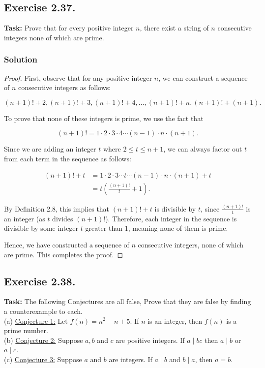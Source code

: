 \documentclass{article}
\begin{document}
\subsection{Exercise 2.37.}
\textbf{Task:} Prove that for every positive integer $n$, there exist a string of $n$ consecutive integers none of which are prime.

\subsubsection*{Solution}

\begin{proof}
    First, observe that for any positive integer $n$, we can construct a sequence of $n$ consecutive integers as follows:

    \[
    (n+1)! + 2, (n+1)! + 3, (n+1)! + 4, \dots, (n+1)! + n, (n+1)! + (n+1).
    \]

    To prove that none of these integers is prime, we use the fact that 

    \[
    (n+1)! = 1 \cdot 2 \cdot 3 \cdot 4 \cdots (n-1) \cdot n \cdot (n+1).
    \]

    Since we are adding an integer $t$ where $2 \leq t \leq n+1$, we can always factor out $t$ from each term in the sequence as follows:

    \begin{align*}
        (n+1)! + t &= 1 \cdot 2 \cdot 3 \cdots t \cdots (n-1) \cdot n \cdot (n+1) + t \\
        &= t\left(\frac{(n+1)!}{t} + 1\right).
    \end{align*}

    By Definition 2.8, this implies that $(n+1)! + t$ is divisible by $t$, since $\frac{(n+1)!}{t}$ is an integer (as $t$ divides $(n+1)!$). Therefore, each integer in the sequence is divisible by some integer $t$ greater than 1, meaning none of them is prime.

    Hence, we have constructed a sequence of $n$ consecutive integers, none of which are prime. This completes the proof.
\end{proof}

\newpage

\subsection{Exercise 2.38.}
\textbf{Task:} The following Conjectures are all false, Prove that they are false by finding a counterexample to each.\\
(a) \underline{Conjecture 1:} Let $f(n) = n^2 -n +5$. If $n$ is an integer, then $f(n)$ is a prime number.\\
(b) \underline{Conjecture 2:} Suppose $a,b$ and $c$ are positive integers. If $a \mid bc$ then $a\mid b$ or $a \mid c$.\\
(c) \underline{Conjecture 3:} Suppose $a$ and $b$ are integers. If $a\mid b$ and $b \mid a$, then $a=b$.
\end{document}

